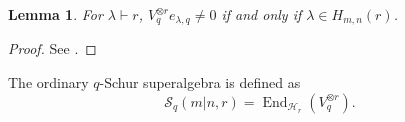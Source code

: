 \documentclass[11pt]{amsart}
\numberwithin{equation}{section}
\theoremstyle{plain}
\newtheorem{lem}[thm]{Lemma}
\theoremstyle{definition}
\theoremstyle{remark}
\begin{document}



\begin{lem}\label{cor:q-hook-support}
For $\lambda\vdash r$, $V_q^{\otimes r}e_{\lambda,q}\neq0$ if and only if $\lambda\in H_{m,n}(r)$.
\end{lem}

\begin{proof}
See \cite[Corollary~7.8 and Proposition~8.3]{DR11}.
\end{proof}

%


The ordinary $q$-Schur superalgebra is defined as
$$
\mathcal S_q(m|n,r)=\operatorname{End}_{\mathcal H_r}(V_q^{\otimes r}).
$$
\end{document}
